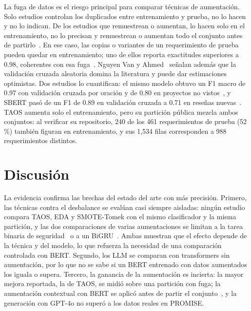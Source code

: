 \documentclass[conference]{IEEEtran}
\begin{document}
\tablaCalidad

La fuga de datos es el riesgo principal para comparar técnicas de aumentación. Solo \nDupSi{} estudios controlan los duplicados entre entrenamiento y prueba, \nDupNo{} no lo hacen y \nDupNoIndica{} no lo indican. De los estudios que remuestrean o aumentan, \nSoloEnt{} lo hacen solo en el entrenamiento, \nEntNoIndica{} no lo precisan y \nNoEnt{} remuestrean o aumentan todo el conjunto antes de partirlo~\cite{Metu2024-Hybrid,Ali2025-Cloud,Kaur2026-Hybrid,Vijayvargiya2022-Software,Abbas2024-Enscl}. En ese caso, las copias o variantes de un requerimiento de prueba pueden quedar en entrenamiento; uno de ellos reporta exactitudes superiores a 0.98, coherentes con esa fuga~\cite{Metu2024-Hybrid}. Nguyen Van y Ahmed~\cite{NguyenVan2026-Evaluating} señalan además que la validación cruzada aleatoria domina la literatura y puede dar estimaciones optimistas. Dos estudios lo cuantifican: el mismo modelo obtuvo un F1 macro de 0.97 con validación cruzada por oración y de 0.80 en proyectos no vistos~\cite{Almohammady2026-Context}, y SBERT pasó de un F1 de 0.89 en validación cruzada a 0.71 en reseñas nuevas~\cite{Bagies2026-Transformer}. TAOS aumenta solo el entrenamiento, pero su partición pública mezcla ambos conjuntos: al verificar su repositorio, 240 de los 461 requerimientos de prueba (52\,\%) también figuran en entrenamiento, y sus 1,534 filas corresponden a 988 requerimientos distintos.

\section{Discusión}\label{sec:discusion}
La evidencia confirma las brechas del estado del arte con más precisión. Primero, las técnicas contra el desbalance se evalúan casi siempre aisladas: ningún estudio compara TAOS, EDA y SMOTE-Tomek con el mismo clasificador y la misma partición, y las dos comparaciones de varias aumentaciones se limitan a la tarea binaria de seguridad~\cite{Petrillo2025-Explainable} o a un BiGRU~\cite{Aldhafer2026-Adaptive}. Ambas muestran que el efecto depende de la técnica y del modelo, lo que refuerza la necesidad de una comparación controlada con BERT. Segundo, los LLM se comparan con transformers sin aumentación, por lo que no se sabe si un BERT entrenado con datos aumentados los iguala o supera. Tercero, la ganancia de la aumentación es incierta: la mayor mejora reportada, la de TAOS, se midió sobre una partición con fuga; la aumentación contextual con BERT se aplicó antes de partir el conjunto~\cite{Kaur2026-Hybrid}, y la generación con GPT-4o no superó a los datos reales en PROMISE.
\end{document}
